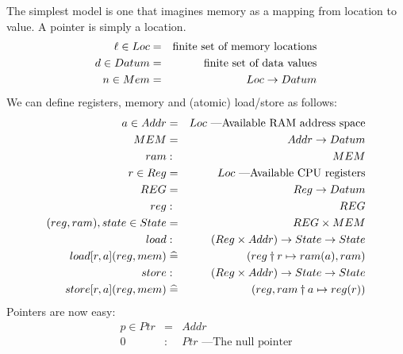 The simplest model is one that imagines memory as a mapping
from location to value. A pointer is simply a location.
\begin{eqnarray*}
   \ell \in Loc &=& \mbox{finite set of memory locations}
\\ d \in Datum &=& \mbox{finite set of data values}
\\ n \in Mem &=& Loc \mathrel{\rightarrow} Datum
\end{eqnarray*}
We can define registers, memory and (atomic) load/store as follows:
\begin{eqnarray*}
   a \in Addr &=& Loc \mbox{ ---Available RAM address space}
\\   MEM &=& Addr \mathrel{\rightarrow} Datum
\\  ram &:& MEM
\\ r \in Reg  &=& Loc \mbox{ ---Available CPU registers}
\\  REG &=& Reg \mathrel{\rightarrow} Datum
\\  reg &:& REG
\\  (reg,ram), state \in State &=& REG \times MEM
\\  load &:& (Reg \times Addr) \mathrel{\rightarrow} State \mathrel{\rightarrow} State
\\  load[r,a](reg,mem) &\mathrel{\widehat=}& (reg\dagger{r} \mapsto {ram(a)},ram)
\\  store &:& (Reg \times Addr) \mathrel{\rightarrow} State \mathrel{\rightarrow} State
\\  store[r,a](reg,mem) &\mathrel{\widehat=}& (reg,ram\dagger{a} \mapsto {reg(r)})
\end{eqnarray*}
Pointers are now easy:
\begin{eqnarray*}
   p \in Ptr &=& Addr
\\ 0 &:& Ptr \mbox{ ---The null pointer}
\end{eqnarray*}
